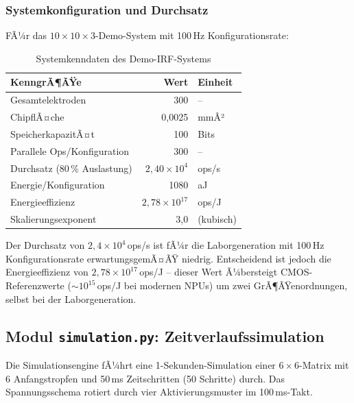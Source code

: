 ﻿\documentclass[a4paper,12pt]{scrreprt}
\theoremstyle{definition}
\begin{document}
\subsubsection{Systemkonfiguration und Durchsatz}

FÃ¼r das $10 \times 10 \times 3$-Demo-System mit 100\,Hz Konfigurationsrate:

\begin{table}[H]
	\centering
	\caption{Systemkenndaten des Demo-IRF-Systems}
	\label{tab:system_kenndaten}
	\begin{tabular}{lrl}
		\toprule
		\textbf{KenngrÃ¶ÃŸe} & \textbf{Wert} & \textbf{Einheit} \\
		\midrule
		Gesamtelektroden              & 300          & -- \\
		ChipflÃ¤che                    & 0,0025       & mmÂ² \\
		SpeicherkapazitÃ¤t             & 100          & Bits \\
		Parallele Ops/Konfiguration   & 300          & -- \\
		Durchsatz (80\,\% Auslastung) & $2{,}40 \times 10^4$ & ops/s \\
		Energie/Konfiguration         & 1080         & aJ \\
		Energieeffizienz              & $2{,}78 \times 10^{17}$ & ops/J \\
		Skalierungsexponent           & 3,0          & (kubisch) \\
		\bottomrule
	\end{tabular}
\end{table}

Der Durchsatz von $2{,}4 \times 10^4$\,ops/s ist fÃ¼r die Laborgeneration
mit 100\,Hz Konfigurationsrate erwartungsgemÃ¤ÃŸ niedrig. Entscheidend ist
jedoch die Energieeffizienz von $2{,}78 \times 10^{17}$\,ops/J -- dieser
Wert Ã¼bersteigt CMOS-Referenzwerte ($\sim 10^{15}$\,ops/J bei modernen
NPUs) um zwei GrÃ¶ÃŸenordnungen, selbst bei der Laborgeneration.

\subsection{Modul \texttt{simulation.py}: Zeitverlaufssimulation}
\label{subsec:demo_simulation}

Die Simulationsengine fÃ¼hrt eine 1-Sekunden-Simulation einer $6 \times 6$-Matrix
mit 6 Anfangstropfen und 50\,ms Zeitschritten (50 Schritte) durch. Das
Spannungsschema rotiert durch vier Aktivierungsmuster im 100\,ms-Takt.
\end{document}
